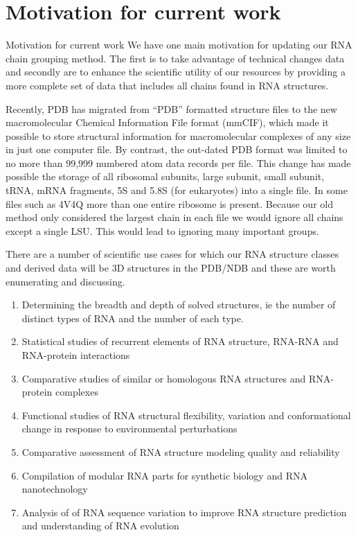 \section{Motivation for current work}

Motivation for current work
We have one main motivation for updating our RNA chain grouping method. The
first is to take advantage of technical changes data and secondly are to enhance
the scientific utility of our resources by providing a more complete set of data
that includes all chains found in RNA structures. 

Recently,  PDB has migrated from “PDB” formatted structure files to the new
macromolecular Chemical Information File format (mmCIF), which made it possible
to store structural information for macromolecular complexes of any size in just
one computer file. By contrast, the out-dated PDB format was limited to no more
than 99,999 numbered atom data records per file. This change has made possible
the storage of all ribosomal subunits, large subunit, small subunit, tRNA, mRNA
fragments, 5S and 5.8S (for eukaryotes) into a single file. In some files such
as 4V4Q \cite{Schuwirth2005} more than one entire ribosome is present. Because
our old method only considered the largest chain in each file we would ignore
all chains except a single LSU. This would lead to ignoring many important
groups.

There are a number of scientific use cases for which our RNA structure classes
and derived data will be  3D structures in the PDB/NDB and these are worth
enumerating and discussing. 

\begin{enumerate}
  \item Determining the breadth and depth of solved structures, ie the number of
    distinct types of RNA and the number of each type.

  \item Statistical studies of recurrent elements of RNA structure, RNA-RNA and
    RNA-protein interactions

  \item Comparative studies of similar or homologous RNA structures and
    RNA-protein complexes

  \item Functional studies of RNA structural flexibility, variation and
    conformational change in response to environmental perturbations

  \item Comparative assessment of RNA structure modeling quality and reliability

  \item Compilation of modular RNA parts for synthetic biology and RNA
    nanotechnology

  \item Analysis of  of RNA sequence variation to improve RNA structure
    prediction and understanding of RNA evolution
\end{enumerate}

